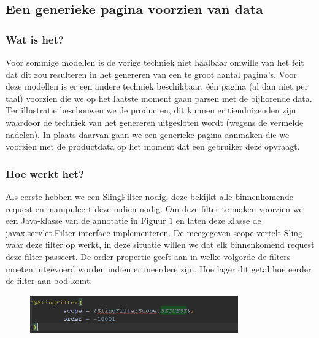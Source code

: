 \documentclass{article}
\begin{document}
	\subsection{Een generieke pagina voorzien van data} 
	\subsubsection{Wat is het?}
    Voor sommige modellen is de vorige techniek niet haalbaar omwille van het feit dat dit zou resulteren in het genereren van een te groot aantal pagina's. Voor deze modellen is er een andere techniek beschikbaar, \'e\'en pagina (al dan niet per taal) voorzien die we op het laatste moment gaan parsen met de bijhorende data. Ter illustratie beschouwen we de producten, dit kunnen er tienduizenden zijn waardoor de techniek van het genereren uitgesloten wordt (wegens de vermelde nadelen). In plaats daarvan gaan we een generieke pagina aanmaken die we voorzien met de productdata op het moment dat een gebruiker deze opvraagt. 
	\subsubsection{Hoe werkt het?}
    Als eerste hebben we een SlingFilter nodig, deze bekijkt alle binnenkomende request en manipuleert deze indien nodig. Om deze filter te maken voorzien we een Java-klasse van de annotatie in Figuur \ref{fig:sling-filter} en laten deze klasse de javax.servlet.Filter interface implementeren. De meegegeven scope vertelt Sling waar deze filter op werkt, in deze situatie willen we dat elk binnenkomend request deze filter passeert. De order propertie geeft aan in welke volgorde de filters moeten uitgevoerd worden indien er meerdere zijn. Hoe lager dit getal hoe eerder de filter aan bod komt.
    
    \begin{figure}[h!]
  		\includegraphics[width=0.8\textwidth]{images/sling-filter.PNG}
  		\label{fig:sling-filter}
	\end{figure}
	
\end{document}
